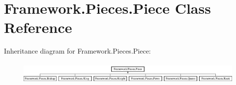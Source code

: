 \hypertarget{class_framework_1_1_pieces_1_1_piece}{}\section{Framework.\+Pieces.\+Piece Class Reference}
\label{class_framework_1_1_pieces_1_1_piece}
Inheritance diagram for Framework.\+Pieces.\+Piece\+:\begin{figure}[H]
\begin{center}
\leavevmode
\includegraphics[height=1.117764cm]{class_framework_1_1_pieces_1_1_piece}
\end{center}
\end{figure}
